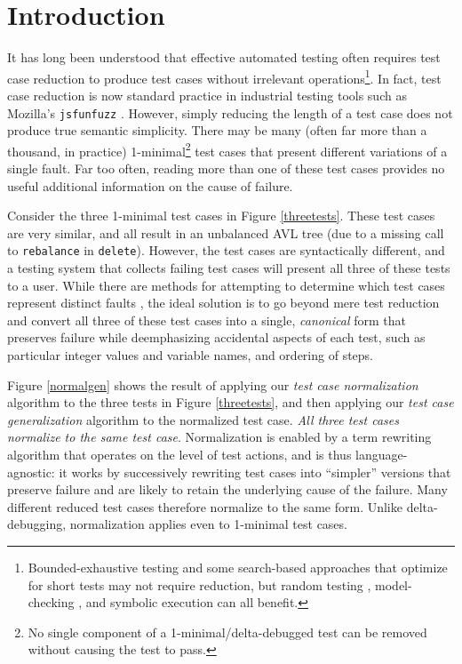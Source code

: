 \section{Introduction}

It has long been understood that effective automated testing often requires
test case reduction \cite{DD,MinUnit,TCminim,ICSEDiff} to produce test cases
without irrelevant operations\footnote{Bounded-exhaustive testing
  \cite{SoftBET} and some search-based approaches that
  optimize for short tests \cite{FA11} may not require reduction, but random
  testing \cite{RandFormal,HamletOnly}, model-checking
  \cite{Gastin04minimizationof}, and symbolic execution \cite{issta14}
  can all benefit.}.  In fact, test case reduction is
now standard practice in industrial testing tools such as Mozilla's
{\tt jsfunfuzz} \cite{jsfunfuzz,jsfunfuzz2,lithium}.  However, simply reducing the length of a test case
does not produce true semantic simplicity.  There may be many
(often far more than a thousand, in practice) 1-minimal\footnote{No
  single component of a 1-minimal/delta-debugged \cite{DD} test can be removed without
  causing the test to pass.} test cases
that present different variations of a single fault.  Far too often,
reading more than one of these test cases provides no useful
additional information on the cause of failure. 

Consider the three 1-minimal test cases in Figure
\ref{threetests}.  These test cases are very similar, and all result
in an unbalanced AVL tree (due to a missing call to {\tt rebalance} in
{\tt delete}).  However, the test cases are syntactically different,
and a testing system that collects failing test cases will present all
three of these tests to a user.  While there are methods for
attempting to determine which test cases represent distinct faults
\cite{PLDI13}, the ideal solution is to go beyond mere test reduction
and convert all three of these
test cases into a single, \emph{canonical} form that preserves failure
while deemphasizing accidental aspects of each test, such as
particular integer values and variable names, and ordering of steps.

Figure \ref{normalgen} shows the result of applying our \emph{test
  case normalization} algorithm to the three tests in Figure
\ref{threetests}, and then applying our \emph{test case
  generalization} algorithm to the normalized test case.  \emph{All
  three test cases normalize to the same test case}.  Normalization is
enabled by a term rewriting algorithm \cite{term2,term1} that operates
on the level of test actions, and is thus language-agnostic:
it works by successively rewriting test cases into ``simpler''
versions that preserve failure and are likely to retain the
underlying cause of the failure. Many
different reduced test cases therefore normalize to the same form.
Unlike delta-debugging, normalization applies even to 1-minimal test
cases.

